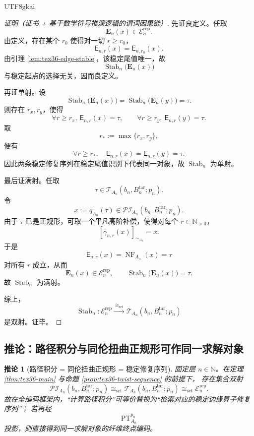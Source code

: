 \documentclass[12pt]{article}
\newtheorem{corollary}{推论}[section]
\newcommand{\NN}{\mathbb{N}}
\newcommand{\PT}{\operatorname{PT}}
\newcommand{\NF}{\operatorname{NF}}
\begin{document}
\begin{CJK*}{UTF8}{gkai}
\begin{proof}[证明（证书 + 基于数学符号推演逻辑的谓词因果链）]
先证良定义。任取
\[
  \mathbf E_n(x)\in \mathcal E_n^{\mathrm{rep}}.
\]
由定义，存在某个 $r_0$ 使得对一切 $r\ge r_0$，
\[
  \mathsf E_{n,r}(x)=\mathsf E_{n,r_0}(x).
\]
由引理 \ref{lem:tex36-edge-stable}，该稳定尾值唯一，故
\[
  \operatorname{Stab}_n\bigl(\mathbf E_n(x)\bigr)
\]
与稳定起点的选择无关，因而良定义。

再证单射。设
\[
  \operatorname{Stab}_n\bigl(\mathbf E_n(x)\bigr)
  =
  \operatorname{Stab}_n\bigl(\mathbf E_n(y)\bigr)
  =\tau.
\]
则存在 $r_x,r_y$，使得
\[
  \forall r\ge r_x,\ \mathsf E_{n,r}(x)=\tau,
  \qquad
  \forall r\ge r_y,\ \mathsf E_{n,r}(y)=\tau.
\]
取
\[
  r_\ast:=\max\{r_x,r_y\},
\]
便有
\[
  \forall r\ge r_\ast,\quad
  \mathsf E_{n,r}(x)=\mathsf E_{n,r}(y)=\tau.
\]
因此两条稳定修复序列在稳定尾值识别下代表同一对象，故 $\operatorname{Stab}_n$ 为单射。

最后证满射。任取
\[
  \tau\in \mathcal{T}_{A_n}(b_n,B_n^{\mathrm{tar}};p_n).
\]
令
\[
  x:=q_{A_n}(\tau)\in \mathcal{PI}_{A_n}(b_n,B_n^{\mathrm{tar}};p_n).
\]
由于 $\tau$ 已是正规形，可取一个平凡高阶补偿，使得对每个 $r\in\NN_{>0}$，
\[
  [\bar{\gamma}_{n,r}(x)]_{\sim_{A_n}}=x.
\]
于是
\[
  \mathsf E_{n,r}(x)
  =
  \NF_{A_n}(x)
  =
  \tau
\]
对所有 $r$ 成立，从而
\[
  \mathbf E_n(x)\in \mathcal E_n^{\mathrm{rep}},
  \qquad
  \operatorname{Stab}_n\bigl(\mathbf E_n(x)\bigr)=\tau.
\]
故 $\operatorname{Stab}_n$ 为满射。

综上，
\[
  \operatorname{Stab}_n:
  \mathcal E_n^{\mathrm{rep}}
  \xrightarrow{\ \cong_{\mathrm{set}}\ }
  \mathcal{T}_{A_n}(b_n,B_n^{\mathrm{tar}};p_n)
\]
是双射。证毕。
\end{proof}

\subsection{推论：路径积分与同伦扭曲正规形可作同一求解对象}
\label{subsec:tex36-pi-equals-twist}

\begin{corollary}[路径积分 = 同伦扭曲正规形 = 稳定修复序列]
\label{cor:tex36-pi-twist-collapse}
固定层 $n\in\NN$。在定理 \ref{thm:tex36-main} 与命题 \ref{prop:tex36-twist-sequence} 的前提下，
存在集合双射
\[
  \mathcal{PI}_{A_n}(b_n,B_n^{\mathrm{tar}};p_n)
  \cong_{\mathrm{set}}
  \mathcal{T}_{A_n}(b_n,B_n^{\mathrm{tar}};p_n)
  \cong_{\mathrm{set}}
  \mathcal E_n^{\mathrm{rep}}.
\]
故在全编码框架内，“计算路径积分”可等价替换为“检索对应的稳定边缘算子修复序列”；
若再经
\[
  \PT_{A_n}^{p_n}
\]
投影，则直接得到同一求解对象的纤维终点编码。
\end{corollary}


\end{CJK*}
\end{document}
